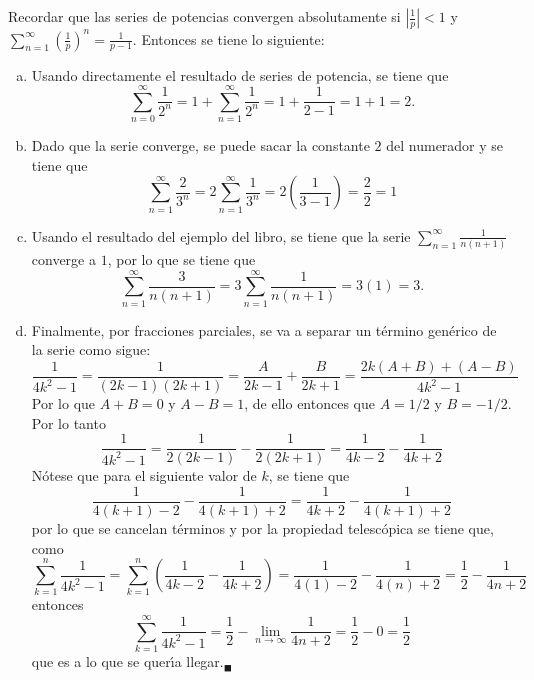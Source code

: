 \begin{solucion}
 Recordar que las series de potencias convergen absolutamente si $\left\lvert \frac{1}{p} \right\rvert < 1$ y $\sum_{n=1}^{\infty} \left( \frac{1}{p} \right)^n = \frac{1}{p-1}$. Entonces se tiene lo siguiente:
 \begin{enumerate}[(a)]
  \item Usando directamente el resultado de series de potencia, se tiene que
  \begin{equation*}
   \sum_{n=0}^{\infty} \frac{1}{2^n} = 1 + \sum_{n=1}^{\infty} \frac{1}{2^n} = 1 + \frac{1}{2-1} = 1 + 1 = 2.
  \end{equation*}

  \item Dado que la serie converge, se puede sacar la constante $2$ del numerador y se tiene que
  \begin{equation*}
   \sum_{n=1}^{\infty} \frac{2}{3^n} = 2 \sum_{n=1}^{\infty} \frac{1}{3^n} = 2\left( \frac{1}{3-1} \right) = \frac{2}{2} = 1
  \end{equation*}

  \item Usando el resultado del ejemplo del libro, se tiene que la serie $\sum_{n=1}^{\infty} \frac{1}{n(n+1)}$ converge a $1$, por lo que se tiene que
  \begin{equation*}
   \sum_{n=1}^{\infty} \frac{3}{n(n+1)} = 3\sum_{n=1}^{\infty} \frac{1}{n(n+1)} = 3(1) = 3.
  \end{equation*}

  \item Finalmente, por fracciones parciales, se va a separar un t\'ermino gen\'erico de la serie como sigue:
  \begin{equation*}
   \frac{1}{4k^2 - 1} = \frac{1}{(2k-1)(2k+1)} = \frac{A}{2k-1} + \frac{B}{2k+1} = \frac{2k(A+B) + (A-B)}{4k^2 - 1}
  \end{equation*}
  Por lo que $A+B = 0$ y $A-B = 1$, de ello entonces que $A = 1/2$ y $B = -1/2$. Por lo tanto
  \begin{equation*}
   \frac{1}{4k^2 - 1} = \frac{1}{2(2k-1)} - \frac{1}{2(2k+1)} = \frac{1}{4k-2} - \frac{1}{4k+2}
  \end{equation*}
  N\'otese que para el siguiente valor de $k$, se tiene que
  \begin{equation*}
   \frac{1}{4(k+1)-2} - \frac{1}{4(k+1)+2} = \frac{1}{4k + 2} - \frac{1}{4(k+1)+2}
  \end{equation*}
  por lo que se cancelan t\'erminos y por la propiedad telesc\'opica se tiene que, como 
  \begin{equation*}
   \sum_{k=1}^{n} \frac{1}{4k^2-1} = \sum_{k=1}^{n} \left( \frac{1}{4k-2} - \frac{1}{4k+2} \right) = \frac{1}{4(1)-2} - \frac{1}{4(n)+2} = \frac{1}{2} - \frac{1}{4n+2}
  \end{equation*}
  entonces
  \begin{equation*}
   \sum_{k=1}^{\infty} \frac{1}{4k^2 - 1} = \frac{1}{2} - \lim_{n\to \infty} \frac{1}{4n+2} = \frac{1}{2} - 0 = \frac{1}{2}
  \end{equation*}
  que es a lo que se quer\'{\i}a llegar.${}_{\blacksquare}$
 \end{enumerate}

\end{solucion}
